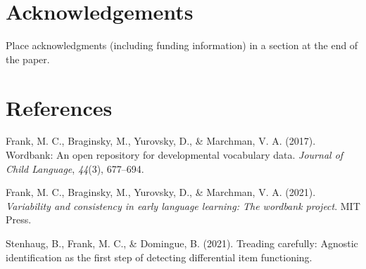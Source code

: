 \documentclass[10pt, letterpaper]{article}
\begin{document}
\hypertarget{acknowledgements}{%
\section{Acknowledgements}\label{acknowledgements}}

Place acknowledgments (including funding information) in a section at
the end of the paper.

\hypertarget{references}{%
\section{References}\label{references}}

\setlength{\parindent}{-0.1in} 
\setlength{\leftskip}{0.125in}

\noindent

\hypertarget{refs}{}
\leavevmode\hypertarget{ref-Frank2017}{}%
Frank, M. C., Braginsky, M., Yurovsky, D., \& Marchman, V. A. (2017).
Wordbank: An open repository for developmental vocabulary data.
\emph{Journal of Child Language}, \emph{44}(3), 677--694.

\leavevmode\hypertarget{ref-Frank2021}{}%
Frank, M. C., Braginsky, M., Yurovsky, D., \& Marchman, V. A. (2021).
\emph{Variability and consistency in early language learning: The
wordbank project}. MIT Press.

\leavevmode\hypertarget{ref-stenhaug2021treading}{}%
Stenhaug, B., Frank, M. C., \& Domingue, B. (2021). Treading carefully:
Agnostic identification as the first step of detecting differential item
functioning.


\end{document}

